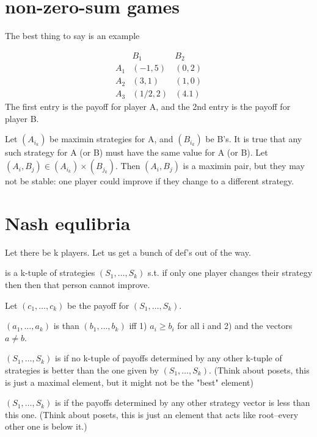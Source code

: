 \section{non-zero-sum games}
The best thing to say is an example

\begin{example}
\[
\begin{matrix}
  &B_1 & B_2 \\
A_1 & (-1,5) &(0,2) \\
A_2 & (3,1)  & (1,0) \\
A_3 & (1/2,2) &(4.1)
\end{matrix}
\]
The first entry is the payoff for player A, and the 2nd entry is the payoff for player B.
\end{example}

Let $(A_{i_k})$ be maximin strategies for A, and $(B_{i_k})$ be B's. It is true that any such strategy for A (or B) must have the same value for A (or B). Let $(A_i,B_j) \in (A_{i_k}) \times (B_{j_k})$. Then $(A_i,B_j)$ is a maximin pair, but they may not be stable: one player could improve if they change to a different strategy. 

\section{Nash equlibria}

Let there be k players. Let us get a bunch of def's out of the way.

\begin{definition}
 is a k-tuple of strategies $(S_1, \dots, S_k)$ s.t. if only one player changes their strategy then then that person cannot improve.

Let $(c_1, \dots, c_k)$ be the payoff for $(S_1, \dots, S_k)$. 

$(a_1, \dots, a_k)$ is  than $(b_1, \dots, b_k)$ iff 1) $a_i \geq b_i$ for all i and 2) and the vectors $a \neq b$.

$(S_1, \dots, S_k)$ is  if no k-tuple of payoffs determined by any other k-tuple of strategies is better than the one given by $(S_1, \dots, S_k)$. (Think about posets, this is just a maximal element, but it might not be the "best" element)

$(S_1, \dots, S_k)$ is  if the payoffs determined by any other strategy vector is less than this one. (Think about posets, this is just an element that acts like root--every other one is below it.)
\end{definition}


